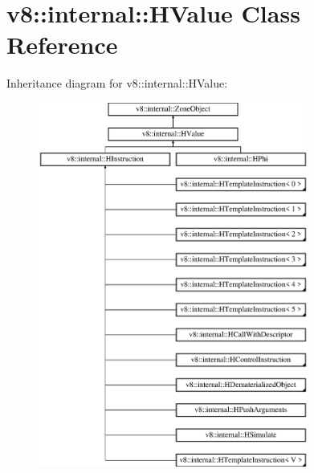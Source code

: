 \hypertarget{classv8_1_1internal_1_1_h_value}{}\section{v8\+:\+:internal\+:\+:H\+Value Class Reference}
\label{classv8_1_1internal_1_1_h_value}
Inheritance diagram for v8\+:\+:internal\+:\+:H\+Value\+:\begin{figure}[H]
\begin{center}
\leavevmode
\includegraphics[height=12.000000cm]{classv8_1_1internal_1_1_h_value}
\end{center}
\end{figure}
